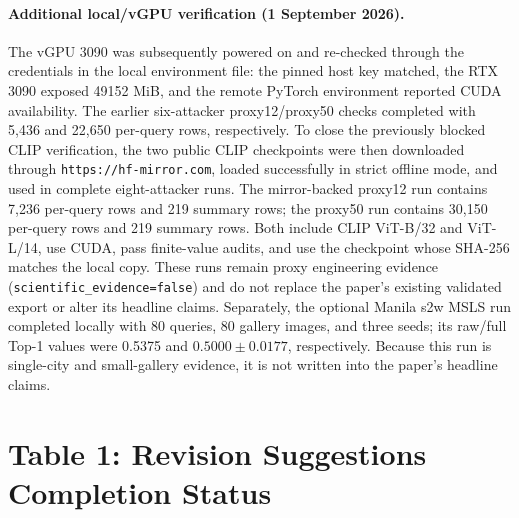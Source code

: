 \documentclass[11pt]{article}
\begin{document}
\paragraph{Additional local/vGPU verification (1 September 2026).} The vGPU
3090 was subsequently powered on and re-checked through the credentials in the
local environment file: the pinned host key matched, the RTX 3090 exposed
49152 MiB, and the remote PyTorch environment reported CUDA availability.
The earlier six-attacker proxy12/proxy50 checks completed with 5,436 and
22,650 per-query rows, respectively. To close the previously blocked CLIP
verification, the two public CLIP checkpoints were then downloaded through
\texttt{https://hf-mirror.com}, loaded successfully in strict offline mode,
and used in complete eight-attacker runs. The mirror-backed proxy12 run
contains 7,236 per-query rows and 219 summary rows; the proxy50 run contains
30,150 per-query rows and 219 summary rows. Both include CLIP ViT-B/32 and
ViT-L/14, use CUDA, pass finite-value audits, and use the checkpoint whose
SHA-256 matches the local copy. These runs remain proxy engineering evidence
(\texttt{scientific\_evidence=false}) and do not replace the paper's existing
validated export or alter its headline claims. Separately, the optional Manila
s2w MSLS run completed locally with 80 queries, 80 gallery images, and three
seeds; its raw/full Top-1 values were 0.5375 and $0.5000\pm0.0177$,
respectively. Because this run is single-city and small-gallery evidence, it
is not written into the paper's headline claims.

\section*{Table 1: Revision Suggestions Completion Status}
\end{document}
